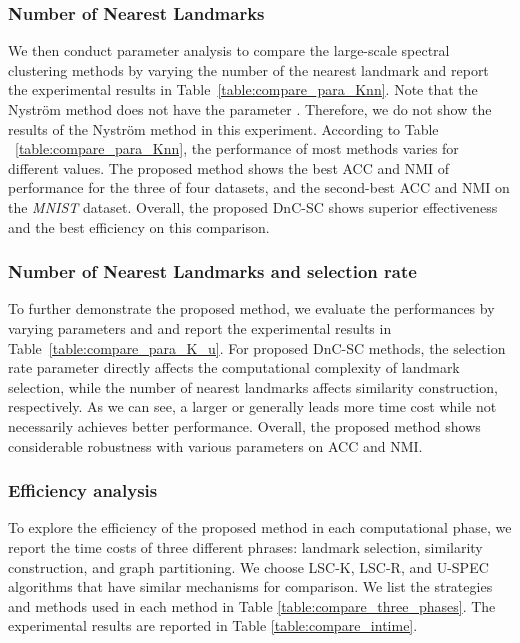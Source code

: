 \subsubsection{Number of Nearest Landmarks }
\label{sec:para_K}

We then conduct parameter analysis to compare the large-scale spectral clustering methods by varying the number of the nearest landmark  and report the experimental results in Table~\ref{table:compare_para_Knn}.
Note that the Nystr{\"{o}}m method does not have the parameter .
Therefore, we do not show the results of the Nystr{\"{o}}m method in this experiment.
According to Table ~\ref{table:compare_para_Knn}, the performance of most methods varies for different  values.
The proposed method shows the best ACC and NMI of performance for the three of four datasets, and the second-best ACC and NMI on the \emph{MNIST} dataset.
Overall, the proposed DnC-SC shows superior effectiveness and the best efficiency on this comparison.

\subsubsection{Number of Nearest Landmarks  and selection rate }
\label{sec:para_K_u}

To further demonstrate the proposed method, we evaluate the performances by varying parameters  and  and report the experimental results in Table~\ref{table:compare_para_K_u}.
For proposed DnC-SC methods, the selection rate parameter  directly affects the computational complexity of landmark selection, while the number of nearest landmarks  affects similarity construction, respectively.
As we can see, a larger  or  generally leads more time cost while not necessarily achieves better performance.
Overall, the proposed method shows considerable robustness with various parameters on ACC and NMI.

\subsubsection{Efficiency analysis}

To explore the efficiency of the proposed method in each computational phase, we report the time costs of three different phrases: landmark selection, similarity construction, and graph partitioning.
We choose LSC-K, LSC-R, and U-SPEC algorithms that have similar mechanisms for comparison.
We list the strategies and methods used in each method in Table \ref{table:compare_three_phases}.
The experimental results are reported in Table \ref{table:compare_intime}.

